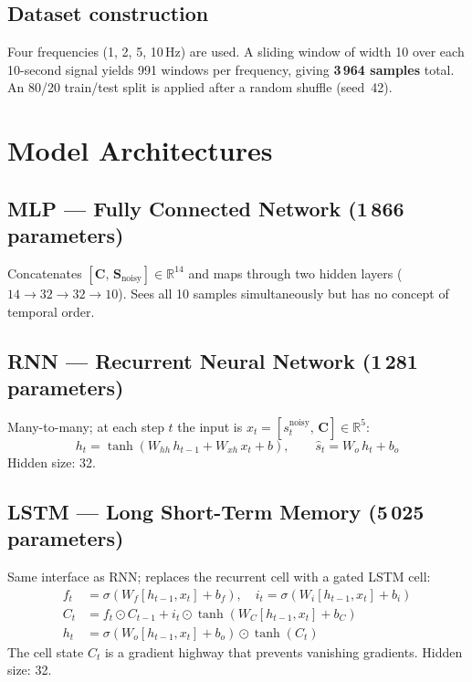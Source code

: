 \documentclass[12pt, a4paper]{article}
\begin{document}
\subsection{Dataset construction}

Four frequencies (1, 2, 5, 10\,Hz) are used. A sliding window of width 10
over each 10-second signal yields 991 windows per frequency,
giving \textbf{3\,964 samples} total. An 80/20 train/test split is applied
after a random shuffle (seed~42).

\section{Model Architectures}

\subsection{MLP — Fully Connected Network (1\,866 parameters)}

Concatenates $[\mathbf{C},\,\mathbf{S}_{\text{noisy}}] \in \mathbb{R}^{14}$
and maps through two hidden layers ($14 \to 32 \to 32 \to 10$).
Sees all 10 samples simultaneously but has no concept of temporal order.

\subsection{RNN — Recurrent Neural Network (1\,281 parameters)}

Many-to-many; at each step $t$ the input is $x_t = [s_t^{\text{noisy}},\,\mathbf{C}]
\in \mathbb{R}^{5}$:
\begin{equation}
    h_t = \tanh(W_{hh}\,h_{t-1} + W_{xh}\,x_t + b), \qquad
    \hat{s}_t = W_o\,h_t + b_o
\end{equation}
Hidden size: 32.

\subsection{LSTM — Long Short-Term Memory (5\,025 parameters)}

Same interface as RNN; replaces the recurrent cell with a gated LSTM cell:
\begin{align}
    f_t &= \sigma(W_f[h_{t-1},x_t]+b_f), \quad
    i_t = \sigma(W_i[h_{t-1},x_t]+b_i) \\
    C_t &= f_t\odot C_{t-1} + i_t\odot\tanh(W_C[h_{t-1},x_t]+b_C) \\
    h_t &= \sigma(W_o[h_{t-1},x_t]+b_o)\odot\tanh(C_t)
\end{align}
The cell state $C_t$ is a gradient highway that prevents vanishing gradients.
Hidden size: 32.
\end{document}
